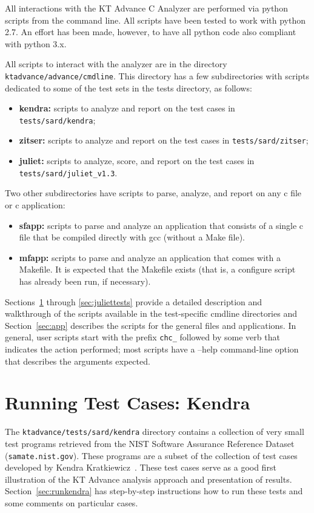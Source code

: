 \documentclass[11pt]{article}
\begin{document}
All interactions with the KT Advance C Analyzer are performed via python scripts from the
command line. All scripts have been tested to work with python 2.7. An effort has been
made, however, to have all python code also compliant with python 3.x.

All scripts to interact with the analyzer are in the directory 
{\tt ktadvance/advance/cmdline}. 
This directory has a few subdirectories with scripts dedicated to some of the test 
sets in the tests directory, as follows:
\begin{itemize}
\item {\bf kendra:} scripts to analyze and report on the test cases in 
 {\tt tests/sard/kendra};
\item {\bf zitser:} scripts to analyze and report on the test cases in
 {\tt tests/sard/zitser};
\item {\bf juliet:} scripts to analyze, score, and report on the test cases in
 {\tt tests/sard/juliet\_v1.3}.
\end{itemize}

Two other subdirectories have scripts to parse, analyze, and report on any c file or
c application:
\begin{itemize}
\item {\bf sfapp:} scripts to parse and analyze an application that consists of a single
  c file that be compiled directly with gcc (without a Make file). 
\item {\bf mfapp:} scripts to parse and analyze an application that comes with a Makefile.
  It is expected that the Makefile exists (that is, a configure script has already been
  run, if necessary).
\end{itemize}

Sections~\ref{sec:kendratests} through \ref{sec:juliettests} provide a detailed 
description and walkthrough of the scripts available in
the test-specific cmdline directories and Section~\ref{sec:app} describes the scripts
for the general files and applications. In general, user scripts start with the 
prefix {\tt chc\_} followed by some verb that indicates the action performed; most 
scripts have a --help command-line
option that describes the arguments expected.

\section{Running Test Cases: Kendra}
\label{sec:kendratests}

The {\tt ktadvance/tests/sard/kendra} directory contains a collection of very small test
programs retrieved from the NIST Software Assurance Reference Dataset ({\tt samate.nist.gov}).
These programs are a subset of the collection of test cases developed by 
Kendra Kratkiewicz~\cite{}. These test cases serve as a good first illustration of
the KT Advance analysis approach and presentation of results. 
Section~\ref{sec:runkendra} has step-by-step instructions how to run these tests
and some comments on particular cases.
\end{document}
